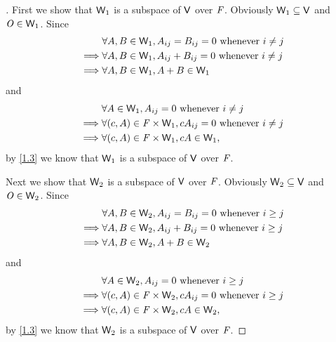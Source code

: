 \begin{proof}[]
	First we show that \(\mathsf{W}_1\) is a subspace of \(\mathsf{V}\) over \(\mathit{F}\).
	Obviously \(\mathsf{W}_1 \subseteq \mathsf{V}\) and \(\mathit{O} \in \mathsf{W}_1\).
	Since
	\begin{align*}
		         & \forall A, B \in \mathsf{W}_1, A_{i j} = B_{i j} = 0 \text{ whenever } i \neq j \\
		\implies & \forall A, B \in \mathsf{W}_1, A_{i j} + B_{i j} = 0 \text{ whenever } i \neq j \\
		\implies & \forall A, B \in \mathsf{W}_1, A + B \in \mathsf{W}_1
	\end{align*}
	and
	\begin{align*}
		         & \forall A \in \mathsf{W}_1, A_{i j} = 0 \text{ whenever } i \neq j                 \\
		\implies & \forall (c, A) \in \mathit{F} \times \mathsf{W}_1, cA_{i j} = 0 \text{ whenever } i \neq j \\
		\implies & \forall (c, A) \in \mathit{F} \times \mathsf{W}_1, cA \in \mathsf{W}_1,
	\end{align*}
	by \cref{1.3} we know that \(\mathsf{W}_1\) is a subspace of \(\mathsf{V}\) over \(\mathit{F}\).

	Next we show that \(\mathsf{W}_2\) is a subspace of \(\mathsf{V}\) over \(\mathit{F}\).
	Obviously \(\mathsf{W}_2 \subseteq \mathsf{V}\) and \(\mathit{O} \in \mathsf{W}_2\).
	Since
	\begin{align*}
		         & \forall A, B \in \mathsf{W}_2, A_{i j} = B_{i j} = 0 \text{ whenever } i \geq j \\
		\implies & \forall A, B \in \mathsf{W}_2, A_{i j} + B_{i j} = 0 \text{ whenever } i \geq j \\
		\implies & \forall A, B \in \mathsf{W}_2, A + B \in \mathsf{W}_2
	\end{align*}
	and
	\begin{align*}
		         & \forall A \in \mathsf{W}_2, A_{i j} = 0 \text{ whenever } i \geq j                 \\
		\implies & \forall (c, A) \in \mathit{F} \times \mathsf{W}_2, cA_{i j} = 0 \text{ whenever } i \geq j \\
		\implies & \forall (c, A) \in \mathit{F} \times \mathsf{W}_2, cA \in \mathsf{W}_2,
	\end{align*}
	by \cref{1.3} we know that \(\mathsf{W}_2\) is a subspace of \(\mathsf{V}\) over \(\mathit{F}\).


\end{proof}
